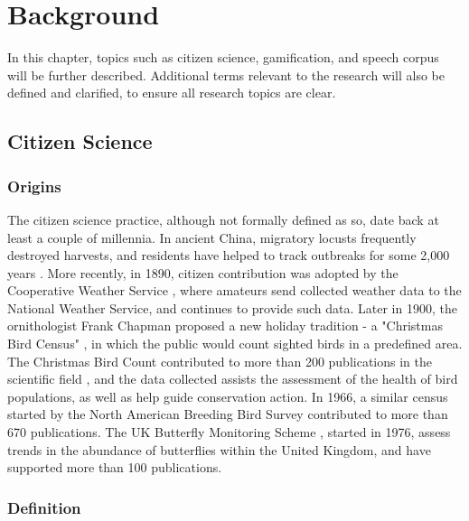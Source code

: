 \chapter{Background}
\label{chap:background}

In this chapter, topics such as citizen science, gamification, and speech corpus will be further described. Additional terms relevant to the research will also be defined and clarified, to ensure all research topics are clear. 

\section{Citizen Science}

\subsection{Origins}

The citizen science practice, although not formally defined as so, date back at least a couple of millennia. In ancient China, migratory locusts frequently destroyed harvests, and residents have helped to track outbreaks for some 2,000 years \cite{irwin2018no}. More recently, in 1890, citizen contribution was adopted by the Cooperative Weather Service \cite{quayle1991effects}, where amateurs send collected weather data to the National Weather Service, and continues to provide such data. Later in 1900, the ornithologist Frank Chapman proposed a new holiday tradition - a "Christmas Bird Census" \cite{harden1985christmas}, in which the public would count sighted birds in a predefined area. The Christmas Bird Count contributed to more than 200 publications in the scientific field \cite{kosmala2016assessing}, and the data collected assists the assessment of the health of bird populations, as well as help guide conservation action. In 1966, a similar census started by the North American Breeding Bird Survey contributed to more than 670 publications. The UK Butterfly Monitoring Scheme \cite{pollard1994monitoring}, started in 1976, assess trends in the abundance of butterflies within the United Kingdom, and have supported more than 100 publications.

\subsection{Definition}

